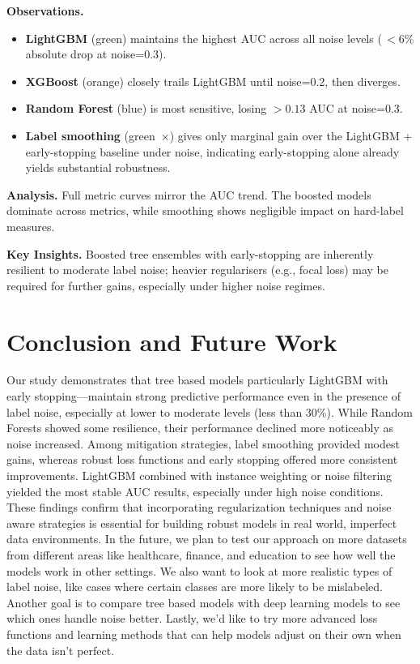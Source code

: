 \documentclass[conference]{IEEEtran}
\begin{document}
\textbf{Observations.}
\begin{itemize}
  \item \textbf{LightGBM} (green) maintains the highest AUC across all noise levels (\,$<\!6\%$ absolute drop at noise=0.3).
  \item \textbf{XGBoost} (orange) closely trails LightGBM until noise=0.2, then diverges.
  \item \textbf{Random Forest} (blue) is most sensitive, losing $>0.13$ AUC at noise=0.3.
  \item \textbf{Label smoothing} (green~$\times$) gives only marginal gain over the LightGBM + early-stopping baseline under noise, indicating early-stopping alone already yields substantial robustness.
\end{itemize}

\textbf{Analysis.}
Full metric curves mirror the AUC trend.  The boosted models dominate across metrics, while smoothing shows negligible impact on hard-label measures.

\textbf{Key Insights.}
Boosted tree ensembles with early-stopping are inherently resilient to moderate label noise; heavier regularisers (e.g., focal loss) may be required for further gains, especially under higher noise regimes.


\section{Conclusion and Future Work}
Our study demonstrates that tree based models particularly LightGBM with early stopping—maintain strong predictive performance even in the presence of label noise, especially at lower to moderate levels (less than 30\%). While Random Forests showed some resilience, their performance declined more noticeably as noise increased. Among mitigation strategies, label smoothing provided modest gains, whereas robust loss functions and early stopping offered more consistent improvements. LightGBM combined with instance weighting or noise filtering yielded the most stable AUC results, especially under high noise conditions. These findings confirm that incorporating regularization techniques and noise aware strategies is essential for building robust models in real world, imperfect data environments.
In the future, we plan to test our approach on more datasets from different areas like healthcare, finance, and education to see how well the models work in other settings. We also want to look at more realistic types of label noise, like cases where certain classes are more likely to be mislabeled. Another goal is to compare tree based models with deep learning models to see which ones handle noise better. Lastly, we’d like to try more advanced loss functions and learning methods that can help models adjust on their own when the data isn’t perfect.
\end{document}
